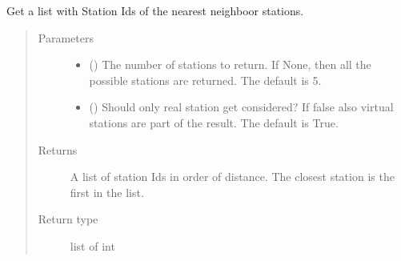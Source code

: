 \documentclass[letterpaper,10pt,english]{sphinxmanual}
\begin{document}
\begin{fulllineitems}
\begin{fulllineitems}
\begin{quote}
\begin{description}
\end{description}\end{quote}

\end{fulllineitems}


\begin{fulllineitems}
\label{\detokenize{weatherDB:weatherDB.station.StationBase.get_neighboor_stids}}
\sphinxAtStartPar
Get a list with Station Ids of the nearest neighboor stations.
\begin{quote}\begin{description}
\item[{Parameters}] \leavevmode\begin{itemize}
\item {} 
\sphinxAtStartPar
{} (\sphinxstyleliteralemphasis{\sphinxupquote{, }}) \textendash{} The number of stations to return.
If None, then all the possible stations are returned.
The default is 5.

\item {} 
\sphinxAtStartPar
{} (\sphinxstyleliteralemphasis{\sphinxupquote{, }}) \textendash{} Should only real station get considered?
If false also virtual stations are part of the result.
The default is True.

\end{itemize}

\item[{Returns}] \leavevmode
\sphinxAtStartPar
A list of station Ids in order of distance.
The closest station is the first in the list.

\item[{Return type}] \leavevmode
\sphinxAtStartPar
list of int

\end{description}\end{quote}


\end{fulllineitems}
\end{fulllineitems}
\end{document}
